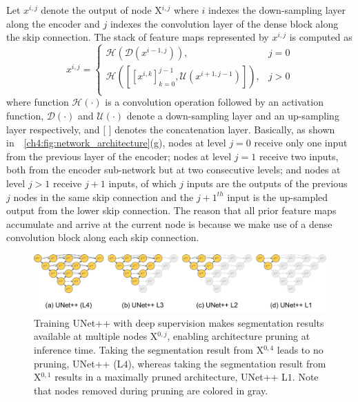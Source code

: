 Let $x^{i,j}$ denote the output of node X$^{i,j}$ where $i$ indexes the down-sampling layer along the encoder and $j$ indexes the convolution layer of the dense block along the skip connection. The stack of feature maps represented by $x^{i,j}$ is computed as
\begin{equation}
\label{eq_unet}
    x^{i,j}=\begin{cases}
      \mathcal{H}\left(\mathcal{D}(x^{i-1,j})\right),  & j=0  \\
      \mathcal{H}\left(\left[\left[x^{i,k}\right]_{k=0}^{j-1}, \mathcal{U}(x^{i+1,j-1}) \right]\right), & j>0  \\
    \end{cases}
\end{equation}
where function $\mathcal{H}(\cdot)$ is a convolution operation followed by an activation function, $\mathcal{D}(\cdot)$ and $\mathcal{U}(\cdot)$ denote a down-sampling layer and an up-sampling layer respectively, and $[$ $]$ denotes the concatenation layer. Basically, as shown in~\figurename~\ref{ch4:fig:network_architecture}(g), nodes at level $j=0$  receive only one input from the previous layer of the encoder; nodes at level $j=1$ receive two inputs, both from the encoder sub-network but at two consecutive levels; and nodes at level $j>1$ receive $j+1$ inputs, of which $j$ inputs are the outputs of the previous $j$ nodes in the same skip connection and the $j+1^{th}$ input is the up-sampled output from the lower skip connection. The reason that all prior feature maps accumulate and arrive at the current node is because we make use of a dense convolution block along each skip connection.

\begin{figure}[t]
\begin{center}
\includegraphics[width=1.0\linewidth]{Figures/CH4/fig_pruned_structure.pdf}
\end{center}
\caption[Deep Supervision Enables Model Pruning]{
Training UNet++ with deep supervision makes segmentation results available at multiple nodes X$^{0,j}$, enabling architecture pruning at inference time. Taking the segmentation result from X$^{0,4}$ leads to no pruning, UNet++ (L$4$),  whereas taking the segmentation result from X$^{0,1}$ results in a maximally pruned architecture, UNet++ L$1$. Note that nodes removed during pruning are colored in gray.}
\label{ch4:fig:prune_structure}
\end{figure}


